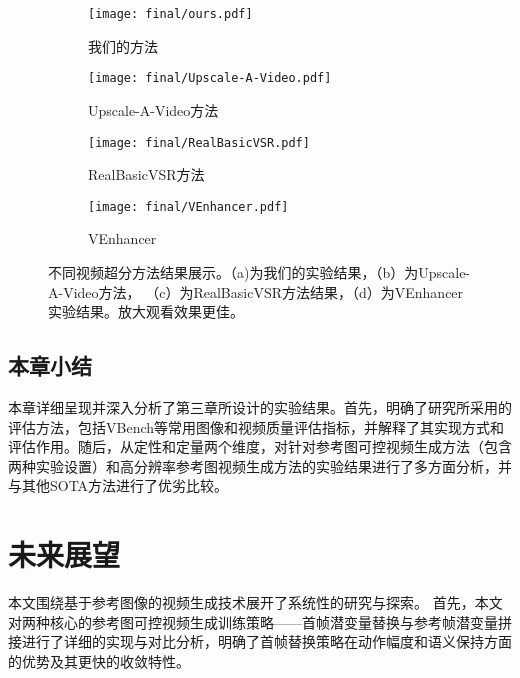 \begin{figure}[H]
    \centering
    \begin{subfigure}[b]{0.9\textwidth}
        \texttt{[image: final/ours.pdf]}
        \caption{我们的方法}
        \label{fig:ours}
    \end{subfigure}

    \vspace{0.5em} %

    \begin{subfigure}[b]{0.3\textwidth}
        \texttt{[image: final/Upscale-A-Video.pdf]}
        \caption{Upscale-A-Video方法}
        \label{fig:upscale}
    \end{subfigure}
    \hfill
    \begin{subfigure}[b]{0.3\textwidth}
        \texttt{[image: final/RealBasicVSR.pdf]}
        \caption{RealBasicVSR方法}
        \label{fig:rbvsr}
    \end{subfigure}
    \hfill
    \begin{subfigure}[b]{0.3\textwidth}
        \texttt{[image: final/VEnhancer.pdf]}
        \caption{VEnhancer}
        \label{fig:venhancer方法}
    \end{subfigure}

    \caption{不同视频超分方法结果展示。（a)为我们的实验结果，（b）为Upscale-A-Video方法， （c）为RealBasicVSR方法结果，（d）为VEnhancer实验结果。放大观看效果更佳。}
    \label{fig:vsrcompare}
\end{figure}



\subsection{本章小结}
本章详细呈现并深入分析了第三章所设计的实验结果。首先，明确了研究所采用的评估方法，包括VBench等常用图像和视频质量评估指标，并解释了其实现方式和评估作用。随后，从定性和定量两个维度，对针对参考图可控视频生成方法（包含两种实验设置）和高分辨率参考图视频生成方法的实验结果进行了多方面分析，并与其他SOTA方法进行了优劣比较。

\section{未来展望}
本文围绕基于参考图像的视频生成技术展开了系统性的研究与探索。
首先，本文对两种核心的参考图可控视频生成训练策略——首帧潜变量替换与参考帧潜变量拼接进行了详细的实现与对比分析，明确了首帧替换策略在动作幅度和语义保持方面的优势及其更快的收敛特性。

